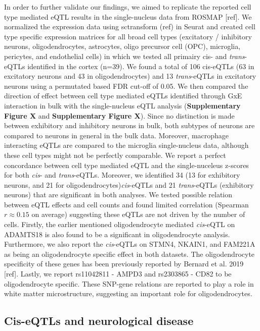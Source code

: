 In order to further validate our findings, we aimed to replicate the reported cell type mediated eQTL results in the single-nucleus data from ROSMAP [ref]. We normalized the expression data using sctransform (ref) in Seurat and created cell type specific expression matrices for all broad cell types (excitatory / inhibitory neurons, oligodendrocytes, astrocytes, oligo precursor cell (OPC), microglia, pericytes, and endothelial cells) in which we tested all primairy cis- and \emph{trans}-eQTLs identified in the cortex (n=39). We found a total of 106 cis-eQTLs (63 in excitatory neurons and 43 in oligodendrocytes) and 13 \emph{trans}-eQTLs in excitatory neurons using a permutated based FDR cut-off of 0.05. We then compared the direction of effect between cell type mediated eQTLs identified through GxE interaction in bulk with the single-nucleus eQTL analysis (\textbf{Supplementary Figure X} and \textbf{Supplementary Figure X}). Since no distinction is made between exhibitory and inhibitory neurons in bulk, both subtypes of neurons are compared to neurons in general in the bulk data. Moreover, macrophage interacting eQTLs are compared to the microglia single-nucleus data, although these cell types might not be perfectly comparable. We report a perfect concordance between cell type mediated eQTL and the single-nuceleus z-scores for both \emph{cis}- and \emph{trans}-eQTLs. Moreover, we identified 34 (13 for exhibitory neurons, and 21 for oligodendrocytes)\emph{cis}-eQTLs and 21 \emph{trans}-eQTLs (exhibitory neurons) that are significant in both analyses. We tested possible relation between eQTL effects and cell counts and found limited correlation (Spearman $r ≈ 0.15$ on average) suggesting these eQTLs are not driven by the number of cells. Firstly, the earlier mentioned oligodendrocyte mediated \emph{cis}-eQTL on ADAMTS18 is also found to be a significant in oligodendrocyte analysis. Furthermore, we also report the \emph{cis}-eQTLs on STMN4, NKAIN1, and FAM221A as being an oligodendrocyte specific effect in both datasets. The oligodendrocyte specificity of these genes has been previously reported by Bernard et al. 2019 [ref]. Lastly, we report rs11042811 - AMPD3 and rs2303865 - CD82 to be oligodendrocyte specific. These SNP-gene relations are reported to play a role in white matter microstructure, suggesting an important role for oligodendrocytes.

\subsection{Cis-eQTLs and neurological disease}

